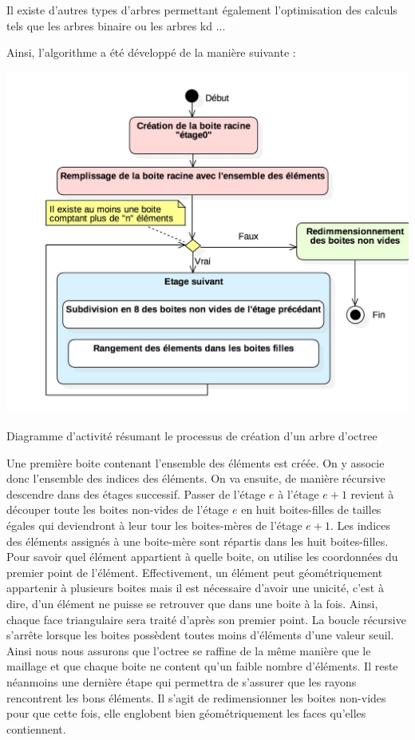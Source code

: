 Il existe d'autres types d'arbres permettant également l'optimisation des calculs tels que les arbres binaire ou les arbres kd ...

Ainsi, l'algorithme a été développé de la manière suivante :

\begin{figureth}
	\includegraphics[width=\linewidth]{images/DiagOctree}
	\caption{Diagramme d'activité résumant le processus de création d'un arbre d'octree}
	\label{DiagOctree}
\end{figureth}

Une première boite contenant l'ensemble des éléments est créée. On y associe donc l'ensemble des indices des éléments. On va ensuite, de manière récursive descendre dans des étages successif. Passer de l'étage $e$ à l'étage $e+1$ revient à découper toute les boites non-vides de l'étage $e$ en huit boites-filles de tailles égales qui deviendront à leur tour les boites-mères de l'étage $e+1$. Les indices des éléments assignés à une boite-mère sont répartis dans les huit boites-filles. Pour savoir quel élément appartient à quelle boite, on utilise les coordonnées du premier point de l'élément. Effectivement, un élément peut géométriquement appartenir à plusieurs boites mais il est nécessaire d'avoir une unicité, c'est à dire, d'un élément ne puisse se retrouver que dans une boite à la fois. Ainsi, chaque face triangulaire sera traité d'après son premier point. La boucle récursive s'arrête lorsque les boites possèdent toutes moins d'éléments d'une valeur seuil. Ainsi nous nous assurons que l'octree se raffine de la même manière que le maillage et que chaque boite ne content qu'un faible nombre d'éléments.
Il reste néanmoins une dernière étape qui permettra de s'assurer que les rayons rencontrent les bons éléments. Il s'agit de redimensionner les boites non-vides pour que cette fois, elle englobent bien géométriquement les faces qu'elles contiennent.

